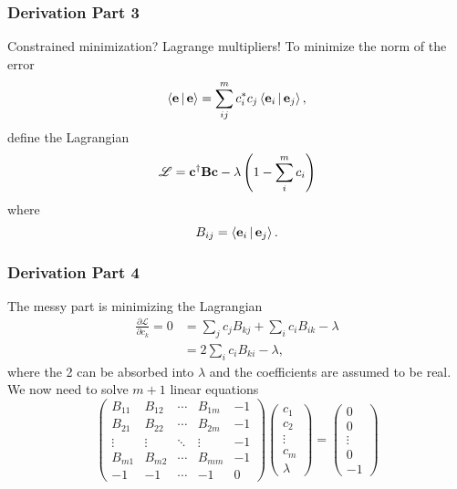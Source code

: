 \documentclass[10pt,compress,red]{beamer}
\begin{document}
\begin{frame}
  \frametitle{Derivation Part 3} Constrained minimization? Lagrange
  multipliers! To minimize the norm of the error
  \begin{equation}
    \Braket{\boldsymbol{\mathbf{e}}|\boldsymbol{\mathbf{e}}} = \sum_{ij}^{m} c_{i}^{*} c_{j} \Braket{\boldsymbol{\mathbf{e}}_{i}|\boldsymbol{\mathbf{e}}_{j}},
  \end{equation}
  define the Lagrangian
  \begin{equation}
    \mathscr{L} = \boldsymbol{\mathbf{c}}^{\dagger}\boldsymbol{\mathbf{B}}\boldsymbol{\mathbf{c}} - \lambda \left( 1 - \sum_{i}^{m} c_{i} \right)
  \end{equation}
  where
  \begin{equation}
    B_{ij} = \Braket{\boldsymbol{\mathbf{e}}_{i}|\boldsymbol{\mathbf{e}}_{j}}.
  \end{equation}
\end{frame}

\begin{frame}
  \frametitle{Derivation Part 4}
  The messy part is minimizing the Lagrangian
  \begin{align}
    \frac{\partial\mathscr{L}}{\partial c_{k}} = 0 &= \sum_{j} c_{j}B_{kj} + \sum_{i} c_{i}B_{ik} - \lambda \\
&= 2 \sum_{i} c_{i} B_{ki} - \lambda,
  \end{align}
  where the 2 can be absorbed into \(\lambda\) and the coefficients
  are assumed to be real. We now need to solve \(m+1\) linear
  equations
  \begin{equation}
    \begin{pmatrix}
      B_{11} & B_{12} & \cdots & B_{1m} & -1 \\
      B_{21} & B_{22} & \cdots & B_{2m} & -1 \\
      \vdots & \vdots & \ddots & \vdots & -1 \\
      B_{m1} & B_{m2} & \cdots & B_{mm} & -1 \\
      -1 & -1 & \cdots & -1 & 0
    \end{pmatrix}
    \begin{pmatrix}
      c_{1} \\ c_{2} \\ \vdots \\ c_{m} \\ \lambda
    \end{pmatrix}
    =
    \begin{pmatrix}
      0 \\ 0 \\ \vdots \\ 0 \\ -1
    \end{pmatrix}
  \end{equation}
\end{frame}
\end{document}
